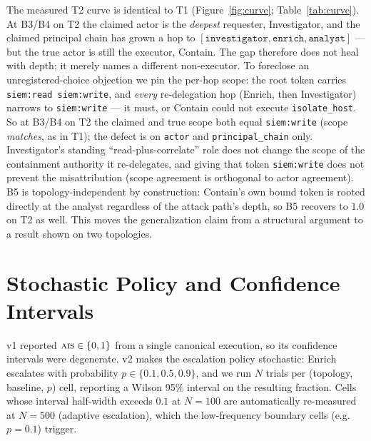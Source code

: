 \documentclass[11pt]{article}
\newcommand{\ais}{\textsc{ais}}
\newcommand{\code}[1]{\texttt{#1}}
\begin{document}
The measured T2 curve is identical to T1
(Figure~\ref{fig:curve}; Table~\ref{tab:curve}). At B3/B4 on T2 the claimed
actor is the \emph{deepest} requester, Investigator, and the claimed
principal chain has grown a hop to
$[\code{investigator}, \code{enrich}, \code{analyst}]$ --- but the true actor
is still the executor, Contain. The gap therefore does not heal with depth;
it merely names a different non-executor. To foreclose an unregistered-choice
objection we pin the per-hop scope: the root token carries
\code{siem:read siem:write}, and \emph{every} re-delegation hop (Enrich, then
Investigator) narrows to \code{siem:write} --- it must, or Contain could not
execute \code{isolate\_host}. So at B3/B4 on T2 the claimed and true scope both
equal \code{siem:write} (scope \emph{matches}, as in T1); the defect is on
\code{actor} and \code{principal\_chain} only. Investigator's standing
``read-plus-correlate'' role does not change the scope of the containment
authority it re-delegates, and giving that token \code{siem:write} does not
prevent the misattribution (scope agreement is orthogonal to actor agreement).
B5 is topology-independent by construction: Contain's own bound token is rooted
directly at the analyst regardless of the attack path's depth, so B5 recovers
to $1.0$ on T2 as well. This moves the generalization claim from a structural
argument to a result shown on two topologies.

\section{Stochastic Policy and Confidence Intervals}
\label{sec:stochastic}

v1 reported $\ais{}\in\{0,1\}$ from a single canonical execution, so its
confidence intervals were degenerate. v2 makes the escalation policy
stochastic: Enrich escalates with probability $p\in\{0.1,0.5,0.9\}$, and we
run $N$ trials per (topology, baseline, $p$) cell, reporting a Wilson 95\%
interval on the resulting fraction. Cells whose interval half-width exceeds
$0.1$ at $N=100$ are automatically re-measured at $N=500$ (adaptive
escalation), which the low-frequency boundary cells (e.g.\ $p=0.1$) trigger.
\end{document}
